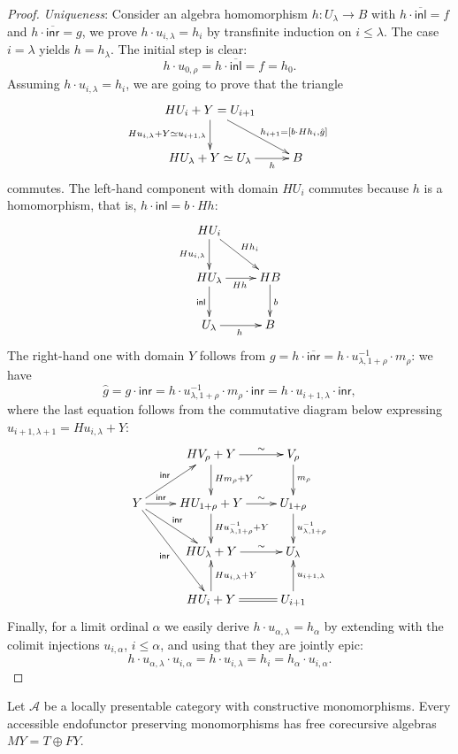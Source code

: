 \documentclass{LMCS}
\theoremstyle{plain}
\theoremstyle{definition}
\numberwithin{equation}{section}
\begin{document}
\begin{proof}
{\it Uniqueness}: Consider an algebra homomorphism
$h:U_\lambda\rightarrow B$ with $h\cdot\overline{\mathsf{inl}}=f$ and
$h\cdot\overline{\mathsf{inr}}=g$, we prove $h\cdot u_{i,\lambda}=h_i$
by transfinite induction on $i\leq\lambda$. The case $i=\lambda$ yields $h=h_\lambda$. The initial step is clear:$$h\cdot u_{0,\rho}=h\cdot\overline{\mathsf{inl}}=f=h_0.$$
Assuming $h\cdot u_{i,\lambda}=h_i$, we are going to prove that the triangle
$$
\xymatrix{
HU_i+Y=U_{i+1}\ar[d]_{{Hu_{i,\lambda}+Y}\simeq u_{i+1,\lambda}}\ar[dr]^(.7)*+{\labelstyle h_{i+1}=[b\cdot Hh_i,\hat g]}\\
HU_\lambda+Y\simeq U_\lambda\ar[r]_-h&B
}
$$
commutes. The left-hand component with domain $HU_i$ commutes because $h$ is a homomorphism, that is, $h\cdot\mathsf{inl}=b\cdot Hh$:
$$
\xymatrix{
HU_i\ar[d]_{{Hu_{i,\lambda}}}\ar[dr]^{Hh_i}\\
HU_\lambda\ar[r]_{Hh}\ar[d]_{\mathsf{inl}}&HB\ar[d]^{b}\\
U_\lambda\ar[r]_h&B
}
$$
The right-hand one with domain $Y$ follows from $g=h\cdot \overline{\mathsf{inr}}=h\cdot u_{\lambda,1+\rho}^{-1}\cdot m_{\rho}$: we have
$$\hat g=g\cdot\mathsf{inr}=h\cdot u^{-1}_{\lambda,1+\rho}\cdot m_{\rho}\cdot\mathsf{inr}=h\cdot u_{i+1,\lambda}\cdot\mathsf{inr},$$
where the last equation follows from the commutative diagram below expressing $u_{i+1,\lambda+1}=Hu_{i,\lambda}+Y$:
$$
\xymatrix{
&HV_\rho+Y\ar[r]^-\sim\ar[d]^{Hm_\rho+Y}&V_\rho\ar[d]^{m_\rho}\\
Y\ar[ur]^-{\mathsf{inr}}\ar[r]^-{\mathsf{inr}}\ar[dr]^-{\mathsf{inr}}\ar[ddr]_-{\mathsf{inr}}&HU_{1+\rho}+Y\ar[d]^{Hu^{-1}_{\lambda,{1+\rho}}+Y}
\ar[r]^-\sim&U_{1+\rho}\ar[d]^{u^{-1}_{\lambda,1+\rho}}\\
&HU_\lambda+Y\ar[r]^-\sim&U_\lambda\\
&HU_i+Y\ar[u]_{Hu_{i,\lambda}+Y}\ar@{=}[r]&U_{i+1}\ar[u]_{u_{i+1,\lambda}}
}
$$
Finally, for a limit ordinal $\alpha$ we easily derive $h\cdot u_{\alpha,\lambda}=h_\alpha$ by extending with the colimit injections $u_{i,\alpha}$, $i\leq \alpha$, and using that they are jointly epic: $$h\cdot u_{\alpha,\lambda}\cdot u_{i,\alpha}=h\cdot u_{i,\lambda}=h_i=h_\alpha\cdot u_{i,\alpha}.$$
\end{proof}

\begin{thm}\label{free cor exists}
Let $\mathcal A$ be a locally presentable category with constructive monomorphisms. Every accessible endofunctor preserving monomorphisms has free corecursive algebras $MY=T\oplus FY$.
\end{thm}
\end{document}

